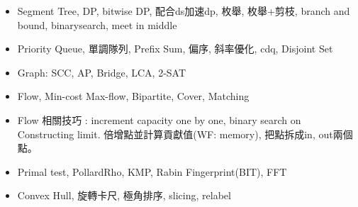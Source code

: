 \begin{itemize}
	\setlength\itemsep{-0.5em}
	\item Segment Tree, DP, bitwise DP, 配合ds加速dp, 枚舉, 枚舉+剪枝, branch and bound, binarysearch, meet in middle
	\item Priority Queue, 單調隊列, Prefix Sum, 偏序, 斜率優化, cdq, Disjoint Set
	\item Graph: SCC, AP, Bridge, LCA, 2-SAT
	\item Flow, Min-cost Max-flow, Bipartite, Cover, Matching
	\item Flow 相關技巧 : increment capacity one by one, binary search on Constructing limit. 倍增點並計算貢獻值(WF: memory), 把點拆成in, out兩個點。
	\item Primal test, PollardRho, KMP, Rabin Fingerprint(BIT), FFT
	\item Convex Hull, 旋轉卡尺, 極角排序, slicing, relabel
\end{itemize}
